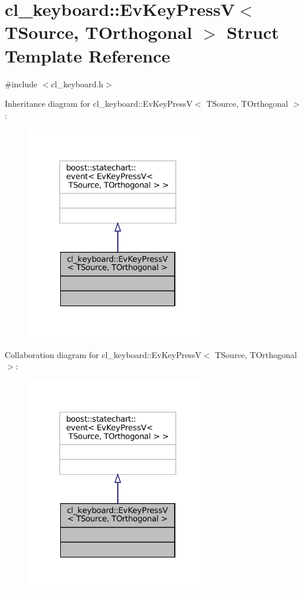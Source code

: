 \hypertarget{structcl__keyboard_1_1EvKeyPressV}{}\section{cl\+\_\+keyboard\+:\+:Ev\+Key\+PressV$<$ T\+Source, T\+Orthogonal $>$ Struct Template Reference}
\label{structcl__keyboard_1_1EvKeyPressV}


{\ttfamily \#include $<$cl\+\_\+keyboard.\+h$>$}



Inheritance diagram for cl\+\_\+keyboard\+:\+:Ev\+Key\+PressV$<$ T\+Source, T\+Orthogonal $>$\+:
\nopagebreak
\begin{figure}[H]
\begin{center}
\leavevmode
\includegraphics[width=227pt]{structcl__keyboard_1_1EvKeyPressV__inherit__graph}
\end{center}
\end{figure}


Collaboration diagram for cl\+\_\+keyboard\+:\+:Ev\+Key\+PressV$<$ T\+Source, T\+Orthogonal $>$\+:
\nopagebreak
\begin{figure}[H]
\begin{center}
\leavevmode
\includegraphics[width=227pt]{structcl__keyboard_1_1EvKeyPressV__coll__graph}
\end{center}
\end{figure}


